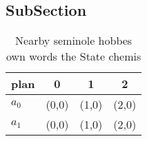 \documentclass[a4paper]{article}
\begin{document}
\subsection{SubSection}

\begin{table}
\begin{adjustbox}{width=0.6\columnwidth}
\begin{tabular}{|l|l|l|l|}
\hline
\textbf{plan} & \multicolumn{1}{c|}{\textbf{0}} & \multicolumn{1}{c|}{\textbf{1}} & \multicolumn{1}{c|}{\textbf{2}} \\ \hline
\textbf{$a_0$}  & (0,0) & (1,0) & (2,0) \\ \hline
\textbf{$a_1$}  & (0,0) & (1,0) & (2,0) \\ \hline
\end{tabular}
\end{adjustbox}
\caption{Nearby seminole hobbes own words the State chemis
}
\end{table}
\end{document}
